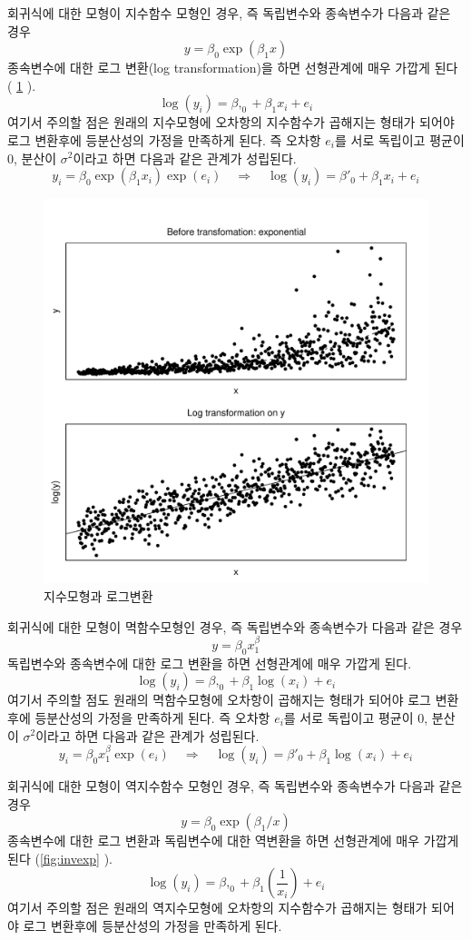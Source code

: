 \documentclass[
]{book}
\theoremstyle{definition}
\theoremstyle{definition}
\theoremstyle{definition}
\theoremstyle{definition}
\theoremstyle{remark}
\begin{document}
회귀식에 대한 모형이 지수함수 모형인 경우, 즉 독립변수와 종속변수가 다음과 같은 경우
\[ y = \beta_0 \exp (\beta_1 x) \]
종속변수에 대한 로그 변환(log transformation)을 하면 선형관계에 매우 가깝게 된다 ( \ref{fig:logtrans} ).
\[ \log(y_i) = \beta,_0 + \beta_1 x_i + e_i \]
여기서 주의할 점은 원래의 지수모형에 오차항의 지수함수가 곱해지는 형태가 되어야 로그 변환후에 등분산성의 가정을 만족하게 된다. 즉
오차항 \(e_i\)를 서로 독립이고 평균이 0, 분산이 \(\sigma^2\)이라고 하면 다음과 같은 관계가 성립된다.
\[ y_i = \beta_0 \exp (\beta_1 x_i)\exp(e_i) \quad \Rightarrow \quad \log(y_i) = \beta'_0 + \beta_1 x_i + e_i \]

\begin{figure}
\includegraphics[width=0.8\linewidth]{logtrans} \caption{지수모형과 로그변환}\label{fig:logtrans}
\end{figure}

회귀식에 대한 모형이 멱함수모형인 경우, 즉 독립변수와 종속변수가 다음과 같은 경우
\[ y = \beta_0  x^\beta_1 \]
독립변수와 종속변수에 대한 로그 변환을 하면 선형관계에 매우 가깝게 된다.
\[ \log(y_i) = \beta,_0 + \beta_1 \log(x_i) + e_i \]
여기서 주의할 점도 원래의 멱함수모형에 오차항이 곱해지는 형태가 되어야 로그 변환후에 등분산성의 가정을 만족하게 된다. 즉
오차항 \(e_i\)를 서로 독립이고 평균이 0, 분산이 \(\sigma^2\)이라고 하면 다음과 같은 관계가 성립된다.
\[ y_i = \beta_0  x^\beta_1 \exp(e_i) \quad \Rightarrow \quad \log(y_i) = \beta'_0 + \beta_1 \log(x_i) + e_i \]

회귀식에 대한 모형이 역지수함수 모형인 경우, 즉 독립변수와 종속변수가 다음과 같은 경우
\[ y = \beta_0 \exp (\beta_1/ x) \]
종속변수에 대한 로그 변환과 독림변수에 대한 역변환을 하면 선형관계에 매우 가깝게 된다 (\ref{fig:invexp} ).
\[ \log(y_i) = \beta,_0 + \beta_1 \left ( \frac{1}{x_i} \right ) + e_i \]
여기서 주의할 점은 원래의 역지수모형에 오차항의 지수함수가 곱해지는 형태가 되어야 로그 변환후에 등분산성의 가정을 만족하게 된다.
\end{document}
